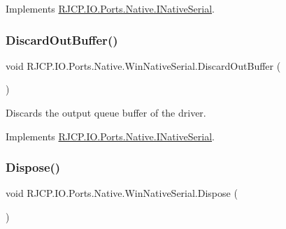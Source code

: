 Implements \mbox{\hyperlink{interface_r_j_c_p_1_1_i_o_1_1_ports_1_1_native_1_1_i_native_serial_a686c3cba30f5d5f706d7d3260c4feea5}{R\+J\+C\+P.\+I\+O.\+Ports.\+Native.\+I\+Native\+Serial}}.

\mbox{\label{class_r_j_c_p_1_1_i_o_1_1_ports_1_1_native_1_1_win_native_serial_a860e9325fe9be729a4cd102d975dc890}} 
\subsubsection{\texorpdfstring{DiscardOutBuffer()}{DiscardOutBuffer()}}
{\footnotesize\ttfamily void R\+J\+C\+P.\+I\+O.\+Ports.\+Native.\+Win\+Native\+Serial.\+Discard\+Out\+Buffer (\begin{DoxyParamCaption}{ }\end{DoxyParamCaption})}



Discards the output queue buffer of the driver. 



Implements \mbox{\hyperlink{interface_r_j_c_p_1_1_i_o_1_1_ports_1_1_native_1_1_i_native_serial_a1faafeb15779e3f998fd76601332ec8f}{R\+J\+C\+P.\+I\+O.\+Ports.\+Native.\+I\+Native\+Serial}}.

\mbox{\label{class_r_j_c_p_1_1_i_o_1_1_ports_1_1_native_1_1_win_native_serial_a7b91c1fe65afccb7d64490c0c9e3e382}} 
\subsubsection{\texorpdfstring{Dispose()}{Dispose()}\hspace{0.1cm}{\footnotesize\ttfamily [1/2]}}
{\footnotesize\ttfamily void R\+J\+C\+P.\+I\+O.\+Ports.\+Native.\+Win\+Native\+Serial.\+Dispose (\begin{DoxyParamCaption}{ }\end{DoxyParamCaption})}



